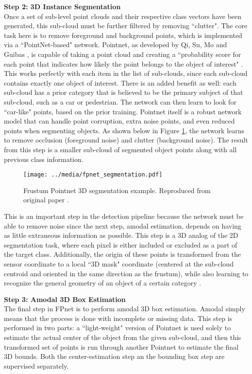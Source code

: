 \textbf{{\large Step 2: 3D Instance Segmentation}} \\
Once a set of sub-level point clouds and their respective class vectors have been generated, this sub-cloud must be further filtered by removing ``clutter". The core task here is to remove foreground and background points, which is implemented via a ``PointNet-based" network. Pointnet, as developed by Qi, Su, Mo and Guibas \cite{qi_pointnet:_2017}, is capable of taking a point cloud and creating a ``probability score for each point that indicates how likely the point belongs to the object of interest" \cite{qi_frustum_2017}. This works perfectly with each item in the list of sub-clouds, since each sub-cloud contains exactly one object of interest. There is an added benefit as well: each sub-cloud has a prior category that is believed to be the primary subject of that sub-cloud, such as a car or pedestrian. The network can then learn to look for ``car-like" points, based on the prior training. Pointnet itself is a robust network model that can handle point corruption, extra noise points, and even reduced points when segmenting objects. As shown below in Figure \ref{fpnet_segmentation}, the network learns to remove occlusion (foreground noise) and clutter (background noise). The result from this step is a smaller sub-cloud of segmented object points along with all previous class information. 

\begin{figure}[H]
    \centering
    \texttt{[image: ../media/fpnet\_segmentation.pdf]}
    \caption{Frustum Pointnet 3D segmentation example. Reproduced from original paper \cite{qi_frustum_2017}.}
    \label{fpnet_segmentation}
\end{figure}

This is an important step in the detection pipeline because the network must be able to remove noise since the next step, amodal estimation, depends on having as little extraneous information as possible. This step is a 3D analog of the 2D segmentation task, where each pixel is either included or excluded as a part of the target class. Additionally, the origin of these points is transformed from the sensor coordinate to a local ``3D mask" coordinate (centered at the sub-cloud centroid and oriented in the same direction as the frustum), while also learning to recognize the general geometry of an object of a certain category \cite{qi_frustum_2017}.

\textbf{{\large Step 3: Amodal 3D Box Estimation}} \\
The final step in FPnet is to perform amodal 3D box estimation. Amodal simply means that the process is done with incomplete or missing data. This step is performed in two parts: a ``light-weight" version of Pointnet is used solely to estimate the actual center of the object from the given sub-cloud, and then this transformed set of points is run through another Pointnet to estimate the final 3D bounds. Both the center-estimation step an the bounding box step are supervised separately. 

